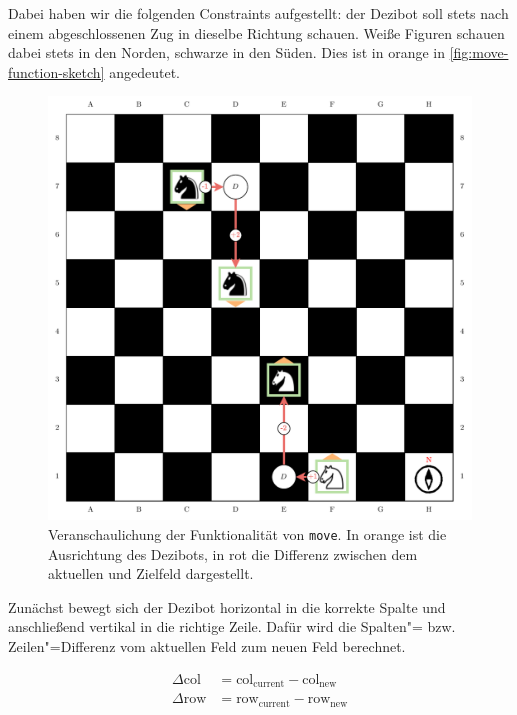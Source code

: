 
Dabei haben wir die folgenden Constraints aufgestellt: der Dezibot soll stets nach einem abgeschlossenen Zug in dieselbe Richtung schauen. Weiße Figuren schauen dabei stets in den Norden, schwarze in den Süden. Dies ist in orange in \autoref{fig:move-function-sketch} angedeutet.

\begin{figure}[h]
    \includegraphics[width=\textwidth]{../assets/move_function_sketch.drawio.pdf}
    \caption{Veranschaulichung der Funktionalität von \texttt{move}. In orange ist die Ausrichtung des Dezibots, in rot die Differenz zwischen dem aktuellen und Zielfeld dargestellt.}
    \label{fig:move-function-sketch}
\end{figure}


Zunächst bewegt sich der Dezibot horizontal in die korrekte Spalte und anschließend vertikal in die richtige Zeile. Dafür wird die Spalten"= bzw. Zeilen"=Differenz vom aktuellen Feld zum neuen Feld berechnet.

\begin{equation*}
    \begin{aligned}
        \Delta\text{col} &= \text{col}_{\text{current}} - \text{col}_{\text{new}} \\
        \Delta\text{row} &= \text{row}_{\text{current}} - \text{row}_{\text{new}}
    \end{aligned}
\end{equation*}

